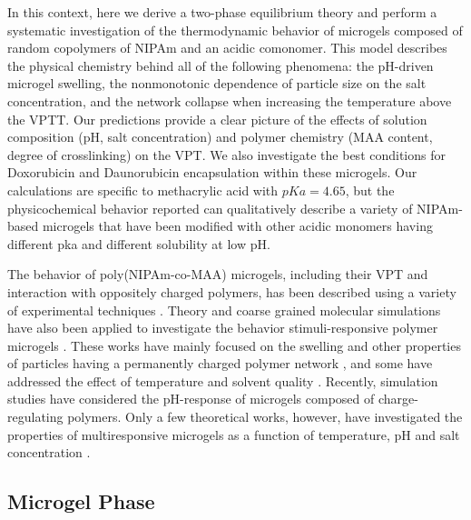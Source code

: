 In this context, here we derive a two-phase equilibrium theory and perform a systematic investigation of the thermodynamic behavior of microgels composed of random copolymers of NIPAm and an acidic comonomer.
This model describes the physical chemistry behind all of the following phenomena: the pH-driven microgel swelling, the nonmonotonic dependence of particle size on the salt concentration, and the network collapse when increasing the temperature above the VPTT.
Our predictions provide a clear picture of the effects of solution composition (pH, salt concentration) and polymer chemistry (MAA content, degree of crosslinking) on the VPT.
We also investigate the best conditions for Doxorubicin and Daunorubicin encapsulation within these microgels.
Our calculations are specific to methacrylic acid with $pKa = 4.65$, but the physicochemical behavior reported can qualitatively describe a variety of NIPAm-based microgels that have been modified with other acidic monomers having different pka and different solubility at low pH.


The behavior of poly(NIPAm-co-MAA) microgels, including their VPT and interaction with oppositely charged polymers, has been described using a variety of experimental techniques .
Theory and coarse grained molecular simulations have also been applied to investigate the behavior stimuli-responsive polymer microgels .
These works have mainly focused on the swelling and other properties of particles having a permanently charged polymer network , and some have addressed the effect of temperature and solvent quality . 
Recently, simulation studies have considered the pH-response of microgels composed of charge-regulating polymers.
Only a few theoretical works, however, have investigated the properties of  multiresponsive microgels as a function of temperature, pH and salt concentration .

\subsection{Microgel Phase}\label{sec:theory}


